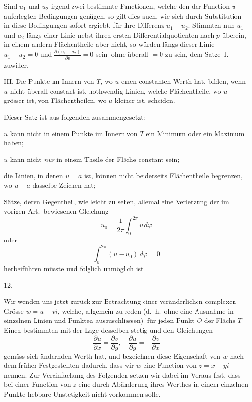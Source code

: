 \documentclass[a4paper,12pt]{article}
\begin{document}
Sind $u_1$ und $u_2$ irgend zwei bestimmte Functionen, welche den
der Function $u$ auferlegten Bedingungen gen\"{u}gen, so gilt
dies auch, wie sich durch Substitution in diese Bedingungen
sofort ergiebt, f\"{u}r ihre Differenz $u_1 - u_2$.  Stimmten nun
$u_1$ und $u_2$ l\"{a}ngs einer Linie nebst ihren ersten
Differentialquotienten nach $p$ \"{u}berein, in einem andern
Fl\"{a}chentheile aber nicht, so w\"{u}rden l\"{a}ngs dieser
Linie $u_1 - u_2 = 0$ und
$\displaystyle \frac{\partial (u_1 - u_2)}{\partial p} = 0$
sein, ohne \"{u}berall $= 0$ zu sein, dem Satze~I. zuwider.

III.  Die Punkte im Innern von $T$, wo $u$ einen constanten Werth
hat, bilden, wenn $u$ nicht \"{u}berall constant ist, nothwendig
Linien, welche Fl\"{a}chentheile, wo $u$ gr\"{o}sser ist, von
Fl\"{a}chentheilen, wo $u$ kleiner ist, scheiden.

Dieser Satz ist aus folgenden zusammengesetzt:

$u$ kann nicht in einem Punkte im Innern von $T$ ein Minimum oder
ein Maximum haben;

$u$ kann nicht \emph{nur} in einem Theile der Fl\"{a}che constant
sein;

die Linien, in denen $u = a$ ist, k\"{o}nnen nicht beiderseits
Fl\"{a}chentheile begrenzen, wo $u - a$ dasselbe Zeichen hat;

S\"{a}tze, deren Gegentheil, wie leicht zu sehen, allemal eine
Verletzung der im vorigen Art.\ bewiesenen Gleichung
\[ u_0 = \frac{1}{2\pi} \int_0^{2\pi} u \, d \varphi \]
oder
\[ \int_0^{2\pi} (u - u_0) \, d \varphi  = 0 \]
herbeif\"{u}hren m\"{u}sste und folglich unm\"{o}glich ist.

\medbreak

\centerline{12.}

\nobreak\medskip

Wir wenden uns jetzt zur\"{u}ck zur Betrachtung einer
ver\"{a}nderlichen complexen Gr\"{o}sse $w = u + vi$, welche,
allgemein zu reden (d.~h.\ ohne eine Ausnahme in einzelnen Linien
und Punkten auszuschliessen), f\"{u}r jeden Punkt $O$ der
Fl\"{a}che $T$ Einen bestimmten mit der Lage desselben stetig und
den Gleichungen
\[ \frac{\partial u}{\partial x}
      = \frac{\partial v}{\partial y},\quad
   \frac{\partial u}{\partial y}
      = - \frac{\partial v}{\partial x} \]
gem\"{a}ss sich \"{a}ndernden Werth hat, und bezeichnen diese
Eigenschaft von $w$ nach dem fr\"{u}her Festgestellten dadurch,
dass wir $w$ eine Function von $z = x + yi$ nennen.  Zur
Vereinfachung des Folgenden setzen wir dabei im Voraus fest, dass
bei einer Function von $z$ eine durch Ab\"{a}nderung ihres
Werthes in einem einzelnen Punkte hebbare Unstetigkeit nicht
vorkommen solle.
\end{document}
